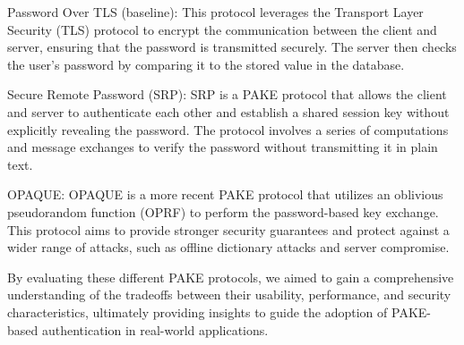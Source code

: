\begin{newitemize}
  \item Password Over TLS (baseline): This protocol leverages the Transport Layer Security (TLS) protocol to encrypt the communication between the client and server, ensuring that the password is transmitted securely. The server then checks the user's password by comparing it to the stored value in the database.
  \item Secure Remote Password (SRP): SRP is a PAKE protocol that allows the client and server to authenticate each other and establish a shared session key without explicitly revealing the password. The protocol involves a series of computations and message exchanges to verify the password without transmitting it in plain text.
  \item OPAQUE: OPAQUE is a more recent PAKE protocol that utilizes an oblivious pseudorandom function (OPRF) to perform the password-based key exchange. This protocol aims to provide stronger security guarantees and protect against a wider range of attacks, such as offline dictionary attacks and server compromise.
\end{newitemize}

By evaluating these different PAKE protocols, we aimed to gain a comprehensive understanding of the tradeoffs between their usability, performance, and security characteristics, ultimately providing insights to guide the adoption of PAKE-based authentication in real-world applications.